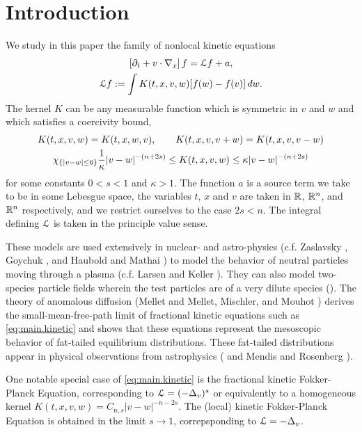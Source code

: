 \section{Introduction}\label{sec:intro}

We study in this paper the family of nonlocal kinetic equations
\begin{gather} \label{eq:main.kinetic}
\left[ \partial_t + v\cdot \nabla_x \right] f = \mathcal{L} f + a, \\
\mathcal{L} f := \int K(t,x,v,w) [f(w)-f(v)] \, dw. \nonumber
\end{gather}
The kernel $K$ can be any measurable function which is symmetric in $v$ and $w$ and which satisfies a coercivity bound,
\begin{equation}\label{eq:kappa_bound} \begin{gathered}
K(t,x,v,w) = K(t,x,w,v), \qquad K(t,x,v,v+w) = K(t,x,v,v-w) \\
\chi_{\{|v-w| \leq 6\}} \frac{1}{\kappa} |v-w|^{-(n+2s)} \leq K(t,x,v,w) \leq \kappa |v-w|^{-(n+2s)}
\end{gathered}\end{equation}
for some constants $0 < s < 1$ and $\kappa > 1$.  The function $a$ is a source term we take to be in some Lebesgue space, the variables $t$, $x$ and $v$ are taken in $\mathbb{R}$, $\mathbb{R}^n$, and $\mathbb{R}^n$ respectively, and we restrict ourselves to the case $2s < n$. The integral defining $\mathcal{L}$ is taken in the principle value sense.  

These models are used extensively in nuclear- and astro-physics (c.f. Zaslavsky \cite{Za}, Goychuk \cite{Go.physics}, and Haubold and Mathai \cite{HaMa}) to model the behavior of neutral particles moving through a plasma (c.f. Larsen and Keller \cite{LaKe}).  They can also model two-species particle fields wherein the test particles are of a very dilute species (\cite{Go.physics}).   The theory of anomalous diffusion (Mellet \cite{Me} and Mellet, Mischler, and Mouhot \cite{MeMiMo}) derives the small-mean-free-path limit of fractional kinetic equations such as \eqref{eq:main.kinetic} and shows that these equations represent the mesoscopic behavior of fat-tailed equilibrium distributions.  These fat-tailed distributions appear in physical observations from astrophysics (\cite{LaKe} and Mendis and Rosenberg \cite{MeRo}).  

One notable special case of \eqref{eq:main.kinetic} is the fractional kinetic Fokker-Planck Equation, corresponding to $\mathcal{L} = (-\Delta_v)^s$ or equivalently to a homogeneous kernel $K(t,x,v,w) = C_{n,s} |v-w|^{-n-2s}$.  The (local) kinetic Fokker-Planck Equation is obtained in the limit $s \to 1$, correpsponding to $\mathcal{L} = - \Delta_v$.  

